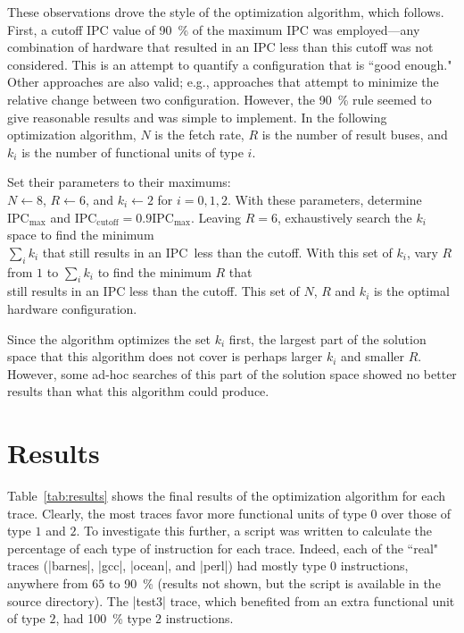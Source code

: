 \documentclass{article}
\let\oldgets\gets
\let\gets\oldgets
\newcommand\IPC{\ensuremath{\text{IPC}}}
\begin{document}
  These observations drove the style of the optimization algorithm,
  which follows. First, a cutoff IPC value of \SI{90}{\percent} of the
  maximum IPC was employed---any combination of hardware that resulted
  in an IPC less than this cutoff was not considered. This is an
  attempt to quantify a configuration that is ``good enough." Other
  approaches are also valid; e.g., approaches that attempt to minimize
  the relative change between two configuration. However, the
  \SI{90}{\percent} rule seemed to give reasonable results and was
  simple to implement. In the following optimization algorithm, $N$ is
  the fetch rate, $R$ is the number of result buses, and $k_i$ is the
  number of functional units of type $i$.
  \begin{codebox}
    \li Set their parameters to their maximums:\\
    $N\gets 8$, $R\gets 6$, and $k_i\gets 2$ for $i = 0, 1, 2$.
    \li With these parameters, determine $\IPC_\text{max}$ and
    $\IPC_\text{cutoff} = 0.9 \IPC_\text{max}$.
    \li Leaving $R = 6$, exhaustively search the $k_i$ space to find
    the minimum \\
    $\sum_i k_i$ that still results in an \IPC\ less than the cutoff.
    \li With this set of $k_i$, vary $R$ from $1$ to $\sum_i k_i$ to
    find the minimum $R$ that \\
    still results in an IPC less than the cutoff.
    \li This set of $N$, $R$ and $k_i$ is the optimal hardware
    configuration.
  \end{codebox}

  Since the algorithm optimizes the set $k_i$ first, the largest part
  of the solution space that this algorithm does not cover is perhaps
  larger $k_i$ and smaller $R$. However, some ad-hoc searches of this
  part of the solution space showed no better results than what this
  algorithm could produce.


  \section{Results}
  \label{sec:results}

  Table~\ref{tab:results} shows the final results of the optimization
  algorithm for each trace. Clearly, the most traces favor more
  functional units of type $0$ over those of type $1$ and $2$. To
  investigate this further, a script was written to calculate the
  percentage of each type of instruction for each trace. Indeed, each
  of the ``real" traces (|barnes|, |gcc|, |ocean|, and |perl|) had
  mostly type $0$ instructions, anywhere from $65$ to
  \SI{90}{\percent} (results not shown, but the script is available in
  the source directory). The |test3| trace, which benefited from an
  extra functional unit of type $2$, had \SI{100}{\percent} type $2$
  instructions.
\end{document}
